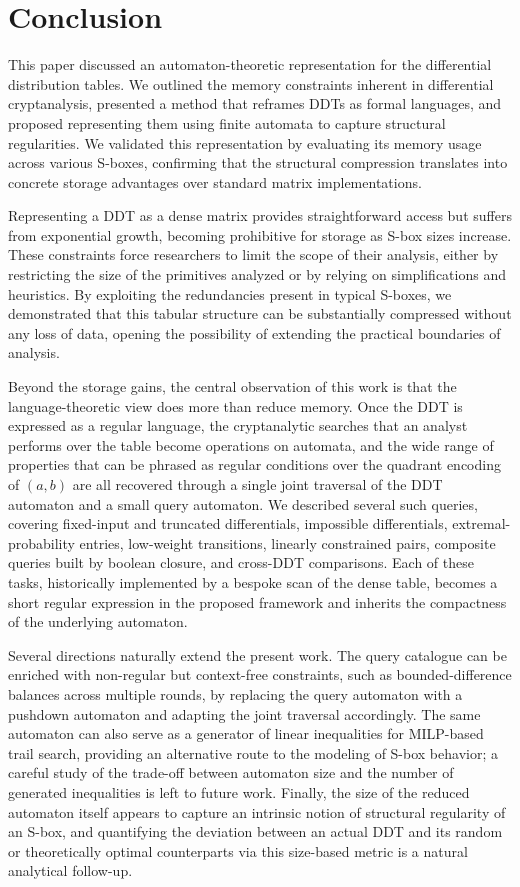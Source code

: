 \section{Conclusion}
\label{sec:conclusion}

This paper discussed an automaton-theoretic representation for the
differential distribution tables. We outlined the memory constraints
inherent in differential cryptanalysis, presented a method that reframes
DDTs as formal languages, and proposed representing them using finite
automata to capture structural regularities. We validated this
representation by evaluating its memory usage across various S-boxes,
confirming that the structural compression translates into concrete storage
advantages over standard matrix implementations.

Representing a DDT as a dense matrix provides straightforward access but
suffers from exponential growth, becoming prohibitive for storage as S-box
sizes increase. These constraints force researchers to limit the scope of
their analysis, either by restricting the size of the primitives analyzed
or by relying on simplifications and heuristics. By exploiting the
redundancies present in typical S-boxes, we demonstrated that this tabular
structure can be substantially compressed without any loss of data, opening
the possibility of extending the practical boundaries of analysis.

Beyond the storage gains, the central observation of this work is that the
language-theoretic view does more than reduce memory. Once the DDT is
expressed as a regular language, the cryptanalytic searches that an
analyst performs over the table become operations on automata, and the
wide range of properties that can be phrased as regular conditions over
the quadrant encoding of $(a,b)$ are all recovered through a single
joint traversal of the DDT automaton and a small query automaton. We
described several such queries, covering
fixed-input and truncated differentials, impossible differentials,
extremal-probability entries, low-weight transitions, linearly constrained
pairs, composite queries built by boolean closure, and
cross-DDT comparisons. Each of these tasks, historically implemented by a
bespoke scan of the dense table, becomes a short regular expression in the
proposed framework and inherits the compactness of the underlying
automaton.

Several directions naturally extend the present work. The query catalogue
can be enriched with non-regular but context-free constraints, such as
bounded-difference balances across multiple rounds, by replacing the
query automaton with a pushdown automaton and adapting the joint
traversal accordingly.
The same automaton can also serve as a generator of linear inequalities
for MILP-based trail search, providing an alternative route to the
modeling of S-box behavior; a careful study of the trade-off between
automaton size and the number of generated inequalities is left to future
work. Finally, the size of the reduced automaton itself appears to capture
an intrinsic notion of structural regularity of an S-box, and quantifying
the deviation between an actual DDT and its random or theoretically
optimal counterparts via this size-based metric is a natural analytical
follow-up.
